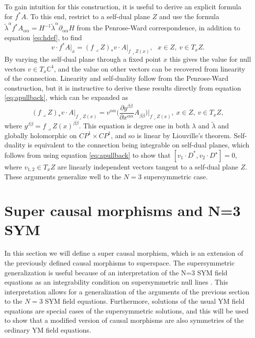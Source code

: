 \documentclass[12pt]{article}
\newcommand{\mbb}{\mathbb}
\begin{document}
To gain intuition for this construction, it is useful to derive an explicit formula for $f^*A$.  To this end, restrict to a self-dual plane $Z$ and use the formula  $\tilde{\lambda}^{\dot{\alpha}}f^*A_{\alpha\dot{\alpha}}=H^{-1}\tilde{\lambda}^{\dot{\alpha}}\partial_{\alpha\dot{\alpha}}H$ from the Penrose-Ward correspondence, in addition to equation \eqref{eq:hdef}, to find 
\begin{equation}\label{eq:apullback}
v \cdot f^*A\lvert_{x}=(f\lrcorner Z)_*v \cdot A\lvert_{f\lrcorner Z(x)}, \ \ \  x\in Z, \ v\in T_xZ.
\end{equation}
By varying the self-dual plane through a fixed point $x$ this gives the value for null vectors $v\in T_x\mbb{C}^{4}$, and the value on other vectors can be recovered from linearity of the connection.  Linearity and self-duality follow from the Penrose-Ward construction, but it is instructive to derive these results directly from equation \eqref{eq:apullback}, which can be expanded as
\begin{equation}
(f\lrcorner Z)_*v\cdot A\lvert_{f\lrcorner Z(x)}=v^{\alpha\dot{\alpha}}\Big(\frac{\partial y^{\beta\dot{\beta}}}{\partial x^{\alpha\dot{\alpha}}}A_{\beta\dot{\beta}}\Big)\Big\lvert_{f\lrcorner Z(x)}, \ x\in Z, \ v\in T_xZ,
\end{equation}
where $y^{\beta\dot{\beta}}=f\lrcorner Z(x)^{\beta\dot{\beta}}$. This equation is degree one in both $\lambda$ and $\tilde{\lambda}$ and globally holomorphic on $CP^1\times CP^1$, and so is linear by Liouville's theorem. Self-duality is equivalent to the connection being integrable on self-dual planes, which follows from using equation \eqref{eq:apullback} to show that $[v_1\cdot D^*,v_2\cdot D^\star]=0$, where $v_{1,2}\in T_x Z$ are linearly independent vectors tangent to a self-dual plane $Z$.  These arguments generalize well to the $N=3$ supersymmetric case.

\section{Super causal morphisms and N=3 SYM}


In this section we will define a super causal morphism, which is an extension of the previously defined causal morphisms to superspace.  The supersymmetric generalization is useful because of an interpretation of the N=3 SYM field equations as an integrability condition on supersymmetric null lines \cite{WITTEN1978394}\cite{Harnad1985Constraint}.  This interpretation allows for a generalization of the arguments of the previous section to the $N=3$ SYM field equations.  Furthermore, solutions of the usual YM field equations are special cases of the supersymmetric solutions, and this will be used to show that a modified version of causal morphisms are also symmetries of the ordinary YM field equations. 
\end{document}
